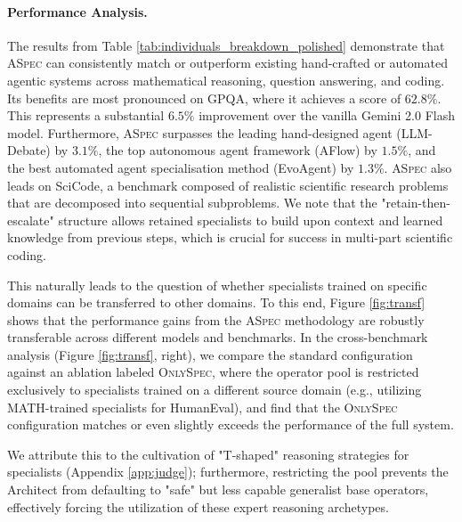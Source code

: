 \documentclass{article} %
\begin{document}
\paragraph{Performance Analysis.} The results from Table \ref{tab:individuals_breakdown_polished} demonstrate that \textsc{ASpec} can consistently match or outperform existing hand-crafted or automated agentic systems across mathematical reasoning, question answering, and coding. Its benefits are most pronounced on GPQA, where it achieves a score of \(62.8\%\). This represents a substantial \(6.5\%\) improvement over the vanilla Gemini 2.0 Flash model. Furthermore, \textsc{ASpec} surpasses the leading hand-designed agent (LLM-Debate) by \(3.1\%\), the top autonomous agent framework (AFlow) by \(1.5\%\), and the best automated agent specialisation method (EvoAgent) by \(1.3\%\). \textsc{ASpec} also leads on SciCode, a benchmark composed of realistic scientific research problems that are decomposed into sequential subproblems. We note that the "retain-then-escalate" structure allows retained specialists to build upon context and learned knowledge from previous steps, which is crucial for success in multi-part scientific coding. 

This naturally leads to the question of whether specialists trained on specific domains can be transferred to other domains. To this end, Figure \ref{fig:transf} shows that the performance gains from the \textsc{ASpec} methodology are robustly transferable across different models and benchmarks. In the cross-benchmark analysis (Figure \ref{fig:transf}, right), we compare the standard configuration against an ablation labeled \textsc{OnlySpec}, where the operator pool is restricted exclusively to specialists trained on a different source domain (e.g., utilizing MATH-trained specialists for HumanEval), and find that the \textsc{OnlySpec} configuration matches or even slightly exceeds the performance of the full system. 

We attribute this to the cultivation of "T-shaped" reasoning strategies for specialists (Appendix \ref{app:judge}); furthermore, restricting the pool prevents the Architect from defaulting to "safe" but less capable generalist base operators, effectively forcing the utilization of these expert reasoning archetypes. 
\end{document}
